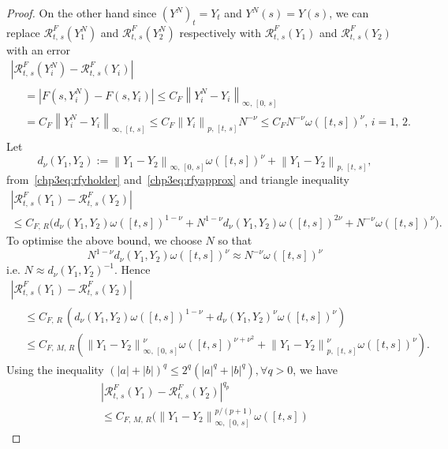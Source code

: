 \documentclass[10pt]{amsart}
\theoremstyle{definition}\newtheorem{defi}[theo]{Definition}\newtheorem{rema}[theo]{Remark}\newtheorem{exam}[theo]{Example}\newtheorem{exem}[theo]{Example}\newtheorem{nota}[theo]{Notation}
\newcommand{\calR}{\mathcal{R}}
\let\oldforall\forall
\renewcommand*{\forall}{\mathrel{\oldforall}}
\begin{document}
\begin{proof}
On the other hand since $(Y^N)_t=Y_t$ and $Y^N(s)=Y(s)$, we can replace $\calR^{F}_{t,\,s}(Y^N_1)$ and $\calR^{F}_{t,\,s}(Y^N_2)$ respectively with $\calR^{F}_{t,\,s}(Y_1)$ and $\calR^{F}_{t,\,s}(Y_2)$ with an error
\begin{multline}\label{chp3eq:rfyapprox}
\left|\calR^{F}_{t,\,s}\left(Y^N_i\right)-\calR^{F}_{t,\,s}(Y_i)\right|\\
\begin{aligned}
&=\left|F\left(s,Y^N_{i}\right)-F\left(s,Y_{i}\right)\right|
\leq C_F\left\|Y^N_{i}-Y_{i}\right\|_{\infty,\,[0,\,s]}\\
&=C_F\left\|Y^N_{i}-Y_{i}\right\|_{\infty,\,[t,\, s]}\leq C_F\left\|Y_{i}\right\|_{p,\,[t,\,s]}N^{-\nu}\leq C_FN^{-\nu} \omega([t,s])^{\nu},\, i=1,\, 2.
\end{aligned}
\end{multline}
Let
\[
d_{\nu}\left(Y_1,Y_2\right):= \left\|Y_1-Y_2\right\|_{\infty,\,[0,\,s]} \omega([t,s])^{\nu}+\left\|Y_1-Y_2\right\|_{p, \,[t,\,s]},
\]
from~\eqref{chp3eq:rfyholder} and~\eqref{chp3eq:rfyapprox} and triangle inequality
\begin{multline*}
\left|\calR^{F}_{t,\,s}(Y_1)-\calR^{F}_{t,\,s}(Y_2)\right|\\
\leq C_{F,\,R}
\big(d_{\nu}\left(Y_1,Y_2\right) \omega([t,s])^{1-\nu}
+N^{1-\nu}d_{\nu}\left(Y_1,Y_2\right) \omega([t,s])^{2\nu}+N^{-\nu} \omega([t,s])^{\nu}\big).
\end{multline*}
To optimise the above bound, we choose $N$ so that
\[
N^{1-\nu} d_{\nu}(Y_1,Y_2) \omega([t,s])^{\nu}\approx N^{-\nu} \omega([t,s])^{\nu}
\]
i.e. $ N\approx d_{\nu}(Y_1,Y_2)^{-1}. $ Hence
\begin{multline*}
\left|\calR^{F}_{t,\,s}(Y_1)-\calR^{F}_{t,\,s}(Y_2)\right|\\
\begin{aligned}
&\leq C_{F,\,R}\,
\left(d_{\nu}(Y_1,Y_2) \omega([t,s])^{1-\nu} + d_{\nu}(Y_1,Y_2)^{\nu} \omega([t,s])^{\nu}\right)\\
&\leq C_{F,\,M,\,R}\left(\left\|Y_1-Y_2\right\|^{\nu}_{\infty,\,[0,\,s]} \omega([t,s])^{\nu+\nu^2}+\left\|Y_1-Y_2\right\|_{p,\,[t,\,s]}^{\nu} \omega([t,s])^{\nu} \right).
\end{aligned}
\end{multline*}
Using the inequality $(|a|+|b|)^q\leq 2^{q}(|a|^q+|b|^q), \forall q>0$, we have
\begin{multline*}
\left|\calR^{F}_{t,\,s}(Y_1)-\calR^{F}_{t,\,s}(Y_2)\right|^{q_p}\\
\leq C_{F,\,M,\,R}\Big(\left\|Y_1-Y_2\right\|^{p/(p+1)}_{\infty,\,[0,\,s]} \omega([t,s])

\end{multline*}
\end{proof}
\end{document}
